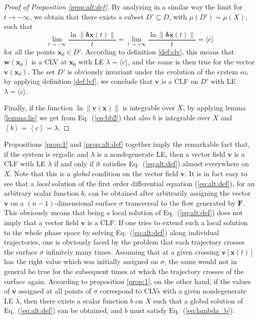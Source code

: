 \documentclass{article}
\theoremstyle{plain}
\theoremstyle{definition}
\theoremstyle{remark}
\newcommand{\vect}[1]{\boldsymbol{#1}}
\begin{document}
\begin{proof}[Proof of Proposition \ref{prop:alt:def}]
  By analyzing in a similar way the limit for $t\to -\infty$, we
  obtain that there exists a subset $D'\subseteq D$, with
  $\mu(D')=\mu(X)$, such that
  \[
  \lim_{t\to -\infty} \frac{\ln \lVert \vect{\delta x}(t) \rVert}{t} =
  \lim_{t\to +\infty} \frac{\ln \lVert \vect{\delta x}(t) \rVert}{t}=
  \langle c\rangle
  \]
  for all the points $\vect{x}_0\in D'$.  According to definition
  \ref{def:clv}, this means that $\vect{w}(\vect{x}_0)$ is a CLV at
  $\vect{x}_0$ with LE $\lambda=\langle c\rangle$, and the same
is then true for the vector $\vect{v}(\vect{x}_0)$.  The set $D'$ is
  obviously invariant under the evolution of the system so, by
  applying definition \ref{def:lvf}, we conclude that $\vect{v}$ is a
  CLF on $D'$ with LE $\lambda=\langle c\rangle$.

Finally, if the function
$\ln \lVert \vect{v}\left(\vect {x}\right) \rVert$ is 
integrable over $X$, by applying lemma \ref{lemma:lie}
we get from Eq.~(\ref{eq:bb2})
that also $b$ is integrable over $X$ and
 $\left<b\right>=\left<c\right>=\lambda$.
\end{proof}

Propositions \ref{prop:1} and \ref{prop:alt:def} together imply the
remarkable fact that, if the system is ergodic and $\lambda$ is a
nondegenerate LE, then a vector field $\vect{v}$ is a CLF with LE
$\lambda$ if and only if it satisfies Eq.~(\ref{eq:alt:def}) almost
everywhere on $X$.  Note that this is a {\em global} condition on the
vector field $\vect{v}$.  It is in fact easy to see that a {\em local}
solution of the first order differential equation (\ref{eq:alt:def}),
for an arbitrary scalar function $b$,
can be obtained after arbitrarily assigning the vector $\vect{v}$ on a
$(n-1)$-dimensional surface $\sigma$ transversal to the flow generated by
$\vect{F}$.  This obviously means that being a local solution of
Eq.~(\ref{eq:alt:def}) does not imply that a vector field $\vect{v}$
is a CLF. 
If one tries to extend such a local solution to the whole phase space
by solving Eq.~(\ref{eq:alt:def})
along individual trajectories, one is obviously faced by the problem that
each trajectory crosses the surface $\sigma$ infinitely many times.
Assuming that at a given crossing $\vect{v}\left[\vect{x}(t)\right]$ has the 
right value which was initially
assigned on $\sigma$, the same would not in general be true
for the subsequent times at which the trajectory crosses of the surface
again. According to proposition \ref{prop:1}, on the other hand,
if the values of $\vect{v}$ assigned at all points of
$\sigma$ correspond to CLVs with a given
nondegenerate LE $\lambda$, then there exists a scalar function
$b$ on $X$ such that a global solution of Eq.~(\ref{eq:alt:def})
can be obtained, and $b$ must satisfy Eq.~(\ref{eq:lambda_b}).
\end{document}
